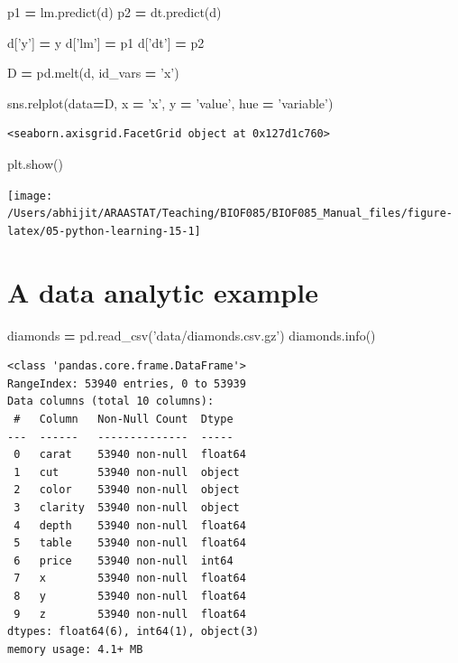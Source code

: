 \documentclass[
  letterpaper,
]{scrbook}
\newenvironment{Shaded}{\begin{snugshade}}{\end{snugshade}}
\newcommand{\NormalTok}[1]{#1}
\newcommand{\OperatorTok}[1]{\textcolor[rgb]{0.81,0.36,0.00}{\textbf{#1}}}
\newcommand{\StringTok}[1]{\textcolor[rgb]{0.31,0.60,0.02}{#1}}
\begin{document}
\begin{Shaded}
\begin{Highlighting}[]
\NormalTok{p1 }\OperatorTok{=}\NormalTok{ lm.predict(d)}
\NormalTok{p2 }\OperatorTok{=}\NormalTok{ dt.predict(d)}

\NormalTok{d[}\StringTok{'y'}\NormalTok{] }\OperatorTok{=}\NormalTok{ y}
\NormalTok{d[}\StringTok{'lm'}\NormalTok{] }\OperatorTok{=}\NormalTok{ p1}
\NormalTok{d[}\StringTok{'dt'}\NormalTok{] }\OperatorTok{=}\NormalTok{ p2}

\NormalTok{D }\OperatorTok{=}\NormalTok{ pd.melt(d, id_vars }\OperatorTok{=} \StringTok{'x'}\NormalTok{)}

\NormalTok{sns.relplot(data}\OperatorTok{=}\NormalTok{D, x }\OperatorTok{=} \StringTok{'x'}\NormalTok{, y }\OperatorTok{=} \StringTok{'value'}\NormalTok{, hue }\OperatorTok{=} \StringTok{'variable'}\NormalTok{)}
\end{Highlighting}
\end{Shaded}

\begin{verbatim}
<seaborn.axisgrid.FacetGrid object at 0x127d1c760>
\end{verbatim}

\begin{Shaded}
\begin{Highlighting}[]
\NormalTok{plt.show()}
\end{Highlighting}
\end{Shaded}

\begin{center}\texttt{[image: /Users/abhijit/ARAASTAT/Teaching/BIOF085/BIOF085\_Manual\_files/figure-latex/05-python-learning-15-1]} \end{center}

\hypertarget{a-data-analytic-example}{%
\section{A data analytic example}\label{a-data-analytic-example}}

\begin{Shaded}
\begin{Highlighting}[]
\NormalTok{diamonds }\OperatorTok{=}\NormalTok{ pd.read_csv(}\StringTok{'data/diamonds.csv.gz'}\NormalTok{)}
\NormalTok{diamonds.info()}
\end{Highlighting}
\end{Shaded}

\begin{verbatim}
<class 'pandas.core.frame.DataFrame'>
RangeIndex: 53940 entries, 0 to 53939
Data columns (total 10 columns):
 #   Column   Non-Null Count  Dtype  
---  ------   --------------  -----  
 0   carat    53940 non-null  float64
 1   cut      53940 non-null  object 
 2   color    53940 non-null  object 
 3   clarity  53940 non-null  object 
 4   depth    53940 non-null  float64
 5   table    53940 non-null  float64
 6   price    53940 non-null  int64  
 7   x        53940 non-null  float64
 8   y        53940 non-null  float64
 9   z        53940 non-null  float64
dtypes: float64(6), int64(1), object(3)
memory usage: 4.1+ MB
\end{verbatim}
\end{document}
